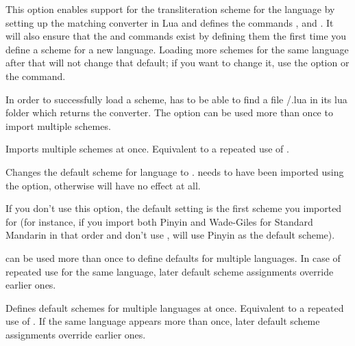 \documentclass{ltxdockit}
\begin{document}
\begin{optionlist}

This option enables support for the transliteration scheme  for
the language  by setting up the matching converter in Lua and
defines the commands ,
 and
. It will also ensure that the
 and 
commands exist by defining them the first time you define a scheme for a new
language. Loading more schemes for the same language after that will not
change that default; if you want to change it, use the 
option or the  command.

In order to successfully load a scheme, \transconv{} has to be able to find
a file /.lua in its lua folder which returns the
converter. The option can be used more than once to import multiple schemes.


Imports multiple schemes at once. Equivalent to a repeated use of
.


Changes the default scheme for language  to .
 needs to have been imported using the  option,
otherwise  will have no effect at all.

If you don't use this option, the default setting is the first scheme you
imported for  (for instance, if you import both Pinyin and
  Wade-Giles for Standard Mandarin in that order and don't use
, \transconv{} will use Pinyin as the default scheme).

 can be used more than once to define defaults for multiple
languages. In case of repeated use for the same language, later default scheme
assignments override earlier ones.


Defines default schemes for multiple languages at once. Equivalent to a
repeated use of . If the same language appears more than
once, later default scheme assignments override earlier ones.

\end{optionlist}
\end{document}
